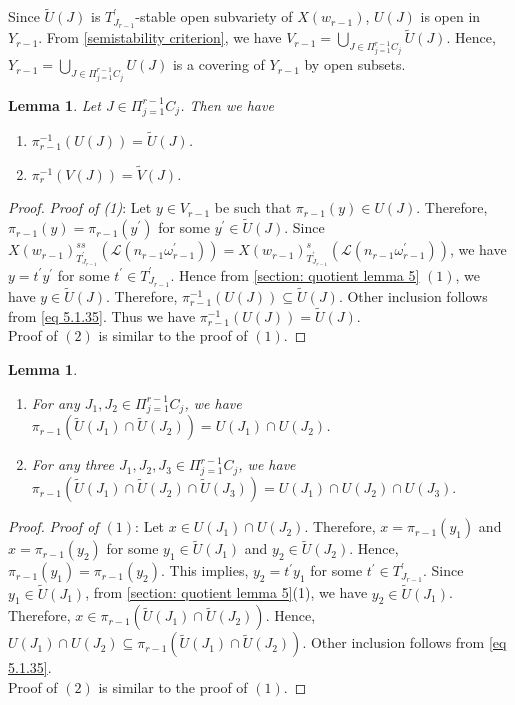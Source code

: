 \documentclass[12pt,reqno]{amsart}
\numberwithin{equation}{section}
\newtheorem{lemma}[theorem]{Lemma}
\theoremstyle{definition}
\begin{document}
	Since $\tilde{U}(J)$ is $T^{\prime}_{J_{r-1}}$-stable open subvariety of $X(w_{r-1})$, $U(J)$ is open in $Y_{r-1}$.
	From \cref{semistability criterion}, we have $V_{r-1}=\displaystyle\bigcup_{J\in\Pi_{j=1}^{r-1}C_{j}}\tilde{U}(J)$. Hence, $Y_{r-1}=\displaystyle\bigcup_{J\in\Pi_{j=1}^{r-1}C_{j}}U(J)$  is a covering of $Y_{r-1}$ by open subsets.
	\begin{lemma} \label{section: quotient lemma 6}Let $J\in\Pi_{j=1}^{r-1}C_{j}$. Then we have 
	\begin{enumerate}
			\item  $\pi_{r-1}^{-1}(U(J))=\tilde{U}(J)$.
			\item   $\pi_{r}^{-1}(V(J))=\tilde{V}(J)$.
	\end{enumerate}
	\end{lemma}
	\begin{proof}{\it Proof of (1)}:
		Let $y\in V_{r-1}$ be such that $\pi_{r-1}(y)\in U(J)$. Therefore, $\pi_{r-1}(y)=\pi_{r-1}(y^{\prime})$ for some $y^{\prime}\in \tilde{U}(J)$. Since $X(w_{r-1})^{ss}_{T^{\prime}_{J_{r-1}}}(\mathcal{L}(n_{r-1}\omega^{\prime}_{r-1}))=X(w_{r-1})^{s}_{T^{\prime}_{J_{r-1}}}(\mathcal{L}(n_{r-1}\omega^{\prime}_{r-1}))$, we have $y=t^{\prime}y^{\prime}$ for some $t^{\prime}\in T^{\prime}_{J_{r-1}}$. Hence from \cref{section: quotient lemma 5} $(1)$, we have $y\in \tilde{U}(J)$. Therefore, $\pi_{r-1}^{-1}(U(J))\subseteq\tilde{U}(J)$. Other inclusion follows from \cref{eq 5.1.35}. Thus we have $\pi_{r-1}^{-1}(U(J))=\tilde{U}(J)$.\\
	Proof of $(2)$ is similar to the proof of $(1)$.
	\end{proof}
	\begin{lemma}\label{section:quotient:lemma 10}
		\begin{enumerate}
			\item For any $J_{1},J_{2}\in\Pi_{j=1}^{r-1}C_{j}$, we have $\pi_{r-1}(\tilde{U}(J_{1})\cap \tilde{U}(J_{2}))=U(J_{1})\cap U(J_{2})$.
			\item  For any three $J_{1},J_{2},J_{3}\in\Pi_{j=1}^{r-1}C_{j}$, we have $\pi_{r-1}(\tilde{U}(J_{1})\cap \tilde{U}(J_{2})\cap \tilde{U}(J_{3}))=U(J_{1})\cap U(J_{2})\cap U(J_{3}).$
		\end{enumerate}
	\end{lemma}
	\begin{proof}{\it{Proof of $(1)$}}:
		Let $x\in U(J_{1})\cap U(J_{2})$. Therefore, $x=\pi_{r-1}(y_{1})$ and $x=\pi_{r-1}(y_{2})$ for some $y_{1}\in \tilde{U}(J_{1})$ and $y_{2}\in \tilde{U}(J_{2})$. Hence, $\pi_{r-1}(y_{1})=\pi_{r-1}(y_{2})$. This implies, $y_{2}=t^{\prime}y_{1}$ for some $t^{\prime}\in T^{\prime}_{J_{r-1}}$. Since $y_{1}\in \tilde{U}(J_{1})$, from \cref{section: quotient lemma 5}(1), we have  $y_{2}\in \tilde{U}(J_{1})$. Therefore, $x\in \pi_{r-1}(\tilde{U}(J_{1})\cap \tilde{U}(J_{2}))$. Hence, $U(J_{1})\cap U(J_{2})\subseteq \pi_{r-1}(\tilde{U}(J_{1})\cap \tilde{U}(J_{2}))$. Other inclusion follows from \cref{eq 5.1.35}.\\
		Proof of $(2)$ is similar to the proof of $(1)$.
	\end{proof}
\end{document}
